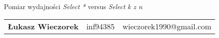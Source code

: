 \thispagestyle{empty}
\begin{center}
{\LARGE{Pomiar wydajności \textit{Select *} versus \textit{Select k z n}\\}}
\vspace{3ex}
\begin{tabular}{llr}
\textbf{Łukasz Wieczorek} & inf94385 & wieczorek1990@gmail.com\\
\end{tabular}
\end{center}